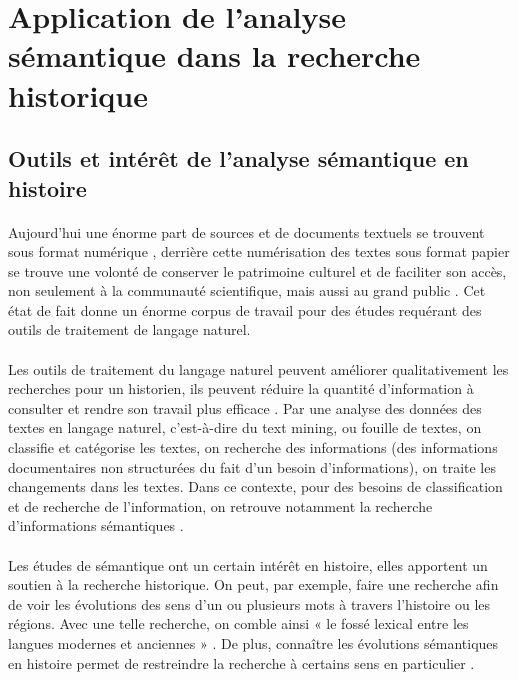 \documentclass{article}
\begin{document}
\section{Application de l'analyse sémantique dans la recherche historique}
\subsection{Outils et intérêt de l'analyse sémantique en histoire}
\paragraph{}
Aujourd’hui une énorme part de sources et de documents textuels se trouvent sous format numérique \cite{glazkova2017automatic}, derrière cette numérisation des textes sous format papier se trouve une volonté de conserver le patrimoine culturel et de faciliter son accès, non seulement à la communauté scientifique, mais aussi au grand public \cite{liebeskind2020deep}. Cet état de fait donne un énorme corpus de travail pour des études requérant des outils de traitement de langage naturel. 
\paragraph{}
Les outils de traitement du langage naturel peuvent améliorer qualitativement les recherches pour un historien, ils peuvent réduire la quantité d’information à consulter et rendre son travail plus efficace \cite{glazkova2017automatic}. Par une analyse des données des textes en langage naturel, c’est-à-dire du text mining, ou fouille de textes, on classifie et catégorise les textes, on recherche des informations (des informations documentaires non structurées du fait d’un besoin d’informations), on traite les changements dans les textes. Dans ce contexte, pour des besoins de classification et de recherche de l’information, on retrouve notamment la recherche d’informations sémantiques \cite{glazkova2017automatic}. 
\paragraph{}
Les études de sémantique ont un certain intérêt en histoire, elles apportent un soutien à la recherche historique. On peut, par exemple, faire une recherche afin de voir les évolutions des sens d’un ou plusieurs mots à travers l’histoire ou les régions. Avec une telle recherche, on comble ainsi « le fossé lexical entre les langues modernes et anciennes » \cite{liebeskind2020deep}. De plus, connaître les évolutions sémantiques en histoire permet de restreindre la recherche à certains sens en particulier \cite{perrone2019gasc}. 
\end{document}
